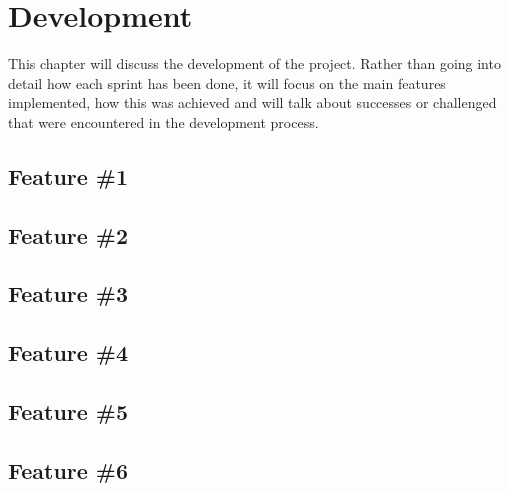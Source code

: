 \chapter{Development}

This chapter will discuss the development of the project. Rather than going into detail how each sprint has been done, it will focus on the main features implemented, how this was achieved and will talk about successes or challenged that were encountered in the development process.

\section{Feature \#1}

\section{Feature \#2}

\section{Feature \#3}

\section{Feature \#4}

\section{Feature \#5}

\section{Feature \#6}